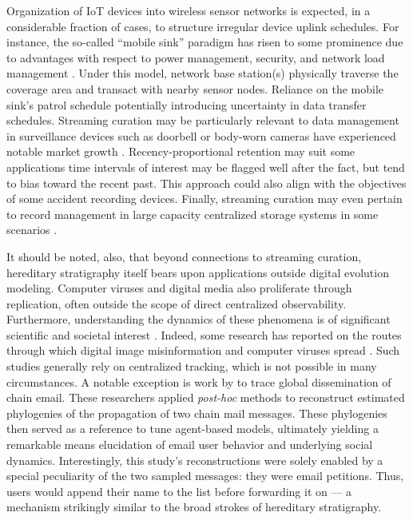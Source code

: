 Organization of IoT devices into wireless sensor networks is expected, in a considerable fraction of cases, to structure irregular device uplink schedules.
For instance, the so-called ``mobile sink'' paradigm has risen to some prominence due to advantages with respect to power management, security, and network load management \citep{jain2022survey}.
Under this model, network base station(s) physically traverse the coverage area and transact with nearby sensor nodes.
Reliance on the mobile sink's patrol schedule potentially introducing uncertainty in data transfer schedules.
Streaming curation may be particularly relevant to data management in surveillance devices such as doorbell or body-worn cameras have experienced notable market growth \citep{calacci2022cop,lum2019research}.
Recency-proportional retention may suit some applications time intervals of interest may be flagged well after the fact, but tend to bias toward the recent past.
This approach could also align with the objectives of some accident recording devices.
Finally, streaming curation may even pertain to record management in large capacity centralized storage systems in some scenarios \citep{bhat2018data}.

It should be noted, also, that beyond connections to streaming curation, hereditary stratigraphy itself bears upon applications outside digital evolution modeling.
Computer viruses and digital media also proliferate through replication, often outside the scope of direct centralized observability.
Furthermore, understanding the dynamics of these phenomena is of significant scientific and societal interest \citep{aslan2020comprehensive,dupuis2019spread,ling2021dissecting}.
Indeed, some research has reported on the routes through which digital image misinformation and computer viruses spread \citep{friggeri2014rumor,cohen1987computer}.
Such studies generally rely on centralized tracking, which is not possible in many circumstances.
A notable exception is work by \cite{libennowell2008tracing} to trace global dissemination of chain email.
These researchers applied \textit{post-hoc} methods to reconstruct estimated phylogenies of the propagation of two chain mail messages.
These phylogenies then served as a reference to tune agent-based models, ultimately yielding a remarkable means elucidation of email user behavior and underlying social dynamics.
Interestingly, this study's reconstructions were solely enabled by a special peculiarity of the two sampled messages: they were email petitions.
Thus, users would append their name to the list before forwarding it on --- a mechanism strikingly similar to the broad strokes of hereditary stratigraphy.

